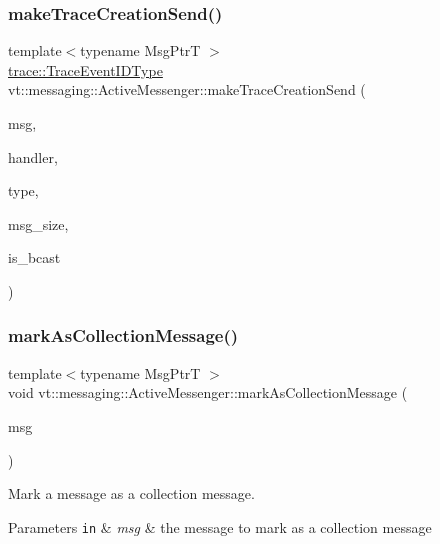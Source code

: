 \subsubsection{\texorpdfstring{make\+Trace\+Creation\+Send()}{makeTraceCreationSend()}}
{\footnotesize\ttfamily template$<$typename Msg\+PtrT $>$ \\
\hyperlink{namespacevt_1_1trace_a64a7185f3e102df8d8258f263ccd1582}{trace\+::\+Trace\+Event\+I\+D\+Type} vt\+::messaging\+::\+Active\+Messenger\+::make\+Trace\+Creation\+Send (\begin{DoxyParamCaption}\item[{Msg\+PtrT}]{msg,  }\item[{\hyperlink{namespacevt_af64846b57dfcaf104da3ef6967917573}{Handler\+Type} const}]{handler,  }\item[{\hyperlink{namespacevt_1_1auto__registry_a9f369ca2b484130b396729e2ddf05241}{auto\+\_\+registry\+::\+Registry\+Type\+Enum}}]{type,  }\item[{\hyperlink{namespacevt_abfa009d900299ac1df967b40ea8f2c8a}{Msg\+Size\+Type}}]{msg\+\_\+size,  }\item[{bool}]{is\+\_\+bcast }\end{DoxyParamCaption})}

\mbox{\label{structvt_1_1messaging_1_1_active_messenger_a0587ea992b0f1b06da38d52a3851aae5}} 
\subsubsection{\texorpdfstring{mark\+As\+Collection\+Message()}{markAsCollectionMessage()}}
{\footnotesize\ttfamily template$<$typename Msg\+PtrT $>$ \\
void vt\+::messaging\+::\+Active\+Messenger\+::mark\+As\+Collection\+Message (\begin{DoxyParamCaption}\item[{Msg\+PtrT const}]{msg }\end{DoxyParamCaption})}



Mark a message as a collection message. 


\begin{DoxyParams}[1]{Parameters}
\mbox{\tt in}  & {\em msg} & the message to mark as a collection message \\
\hline
\end{DoxyParams}
\mbox{\label{structvt_1_1messaging_1_1_active_messenger_ae813b0555258b09de8fa324ed98dcd02}} 
